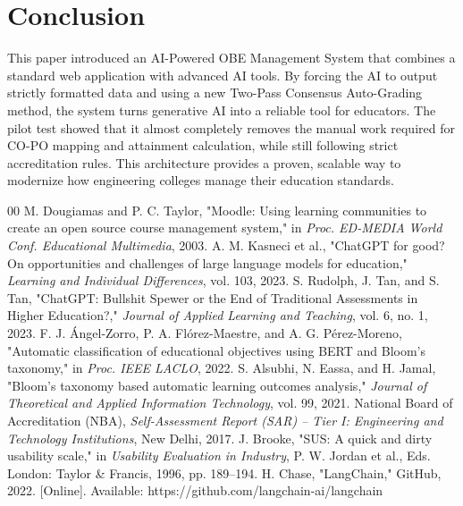 \documentclass[conference]{IEEEtran}
\begin{document}
\section{Conclusion}
This paper introduced an AI-Powered OBE Management System that combines a standard web application with advanced AI tools. By forcing the AI to output strictly formatted data and using a new Two-Pass Consensus Auto-Grading method, the system turns generative AI into a reliable tool for educators. The pilot test showed that it almost completely removes the manual work required for CO-PO mapping and attainment calculation, while still following strict accreditation rules. This architecture provides a proven, scalable way to modernize how engineering colleges manage their education standards.

\begin{thebibliography}{00}
 M. Dougiamas and P. C. Taylor, "Moodle: Using learning communities to create an open source course management system," in \textit{Proc. ED-MEDIA World Conf. Educational Multimedia}, 2003.
 A. M. Kasneci et al., "ChatGPT for good? On opportunities and challenges of large language models for education," \textit{Learning and Individual Differences}, vol. 103, 2023.
 S. Rudolph, J. Tan, and S. Tan, "ChatGPT: Bullshit Spewer or the End of Traditional Assessments in Higher Education?," \textit{Journal of Applied Learning and Teaching}, vol. 6, no. 1, 2023.
 F. J. Ángel-Zorro, P. A. Flórez-Maestre, and A. G. Pérez-Moreno, "Automatic classification of educational objectives using BERT and Bloom's taxonomy," in \textit{Proc. IEEE LACLO}, 2022.
 S. Alsubhi, N. Eassa, and H. Jamal, "Bloom's taxonomy based automatic learning outcomes analysis," \textit{Journal of Theoretical and Applied Information Technology}, vol. 99, 2021.
 National Board of Accreditation (NBA), \textit{Self-Assessment Report (SAR) – Tier I: Engineering and Technology Institutions}, New Delhi, 2017.
 J. Brooke, "SUS: A quick and dirty usability scale," in \textit{Usability Evaluation in Industry}, P. W. Jordan et al., Eds. London: Taylor \& Francis, 1996, pp. 189--194.
 H. Chase, "LangChain," GitHub, 2022. [Online]. Available: https://github.com/langchain-ai/langchain
\end{thebibliography}
\end{document}
